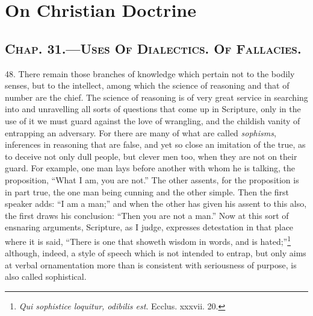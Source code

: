 
\author{Augustine of Hippo}
\chapter[On Christian Doctrine, bk 2.31--2.34]{On Christian
Doctrine}

\section*{\textsc{Chap}. 31.\smaller---\textsc{Uses Of
Dialectics}. \textsc{Of Fallacies}.}

48. There remain those branches of knowledge which pertain not to the
bodily senses, but to the intellect, among which the science of
reasoning and that of number are the chief. The science of reasoning
is of very great service in searching into and unravelling all sorts
of questions that come up in Scripture, only in the use of it we must
guard against the love of wrangling, and the childish vanity of
entrapping an adversary. For there are many of what are called
\textit{sophisms}, inferences in reasoning that are false, and yet so
close an imitation of the true, as to deceive not only dull people,
but clever men too, when they are not on their guard. For example, one
man lays before another with whom he is talking, the proposition,
``What I am, you are not.'' The other assents, for the proposition is
in part true, the one man being cunning and the other simple. Then the
first speaker adds: ``I am a man;'' and when the other has given his
assent to this also, the first draws his conclusion: ``Then you are
not a man.'' Now at this sort of ensnaring arguments, Scripture, as I
judge, expresses detestation in that place where it is said, ``There
is one that showeth wisdom in words, and is
hated;''\footnote{\textit{Qui sophistice loquitur, odibilis est}.
Ecclus. xxxvii. 20.} although, indeed, a style of speech which is not
intended to entrap, but  only aims at verbal ornamentation
more than is consistent with seriousness of purpose, is also called
sophistical.

